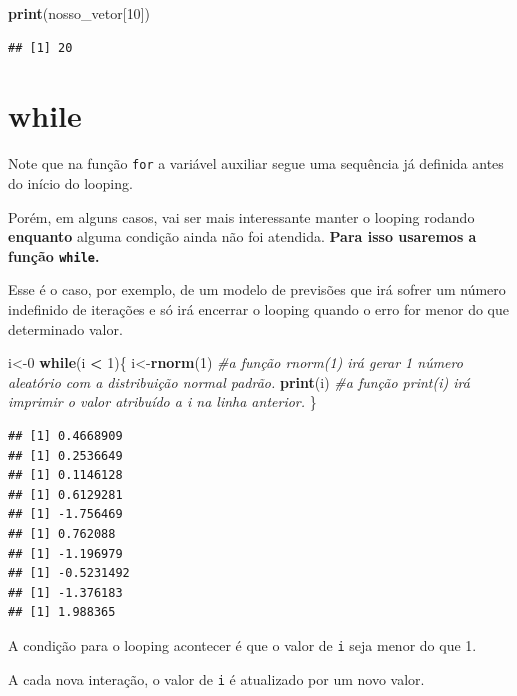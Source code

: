 \documentclass[
]{book}
\newenvironment{Shaded}{\begin{snugshade}}{\end{snugshade}}
\newcommand{\CommentTok}[1]{\textcolor[rgb]{0.56,0.35,0.01}{\textit{#1}}}
\newcommand{\ControlFlowTok}[1]{\textcolor[rgb]{0.13,0.29,0.53}{\textbf{#1}}}
\newcommand{\DecValTok}[1]{\textcolor[rgb]{0.00,0.00,0.81}{#1}}
\newcommand{\KeywordTok}[1]{\textcolor[rgb]{0.13,0.29,0.53}{\textbf{#1}}}
\newcommand{\NormalTok}[1]{#1}
\newcommand{\OperatorTok}[1]{\textcolor[rgb]{0.81,0.36,0.00}{\textbf{#1}}}
\newcommand{\StringTok}[1]{\textcolor[rgb]{0.31,0.60,0.02}{#1}}
\begin{document}
\begin{Shaded}
\begin{Highlighting}[]
\KeywordTok{print}\NormalTok{(nosso_vetor[}\DecValTok{10}\NormalTok{])}
\end{Highlighting}
\end{Shaded}

\begin{verbatim}
## [1] 20
\end{verbatim}

\hypertarget{while}{%
\section{while}\label{while}}

Note que na função \texttt{for} a variável auxiliar segue uma sequência
já definida antes do início do looping.

Porém, em alguns casos, vai ser mais interessante manter o looping
rodando \textbf{enquanto} alguma condição ainda não foi atendida.
\textbf{Para isso usaremos a função \texttt{while}.}

Esse é o caso, por exemplo, de um modelo de previsões que irá sofrer um
número indefinido de iterações e só irá encerrar o looping quando o erro
for menor do que determinado valor.

\begin{Shaded}
\begin{Highlighting}[]
\NormalTok{i<-}\DecValTok{0}
\ControlFlowTok{while}\NormalTok{(i }\OperatorTok{<}\StringTok{ }\DecValTok{1}\NormalTok{)\{}
\NormalTok{  i<-}\KeywordTok{rnorm}\NormalTok{(}\DecValTok{1}\NormalTok{) }\CommentTok{#a função rnorm(1) irá gerar 1 número aleatório com a distribuição normal padrão.}
  \KeywordTok{print}\NormalTok{(i)    }\CommentTok{#a função print(i) irá imprimir o valor atribuído a i na linha anterior.}
\NormalTok{\}}
\end{Highlighting}
\end{Shaded}

\begin{verbatim}
## [1] 0.4668909
## [1] 0.2536649
## [1] 0.1146128
## [1] 0.6129281
## [1] -1.756469
## [1] 0.762088
## [1] -1.196979
## [1] -0.5231492
## [1] -1.376183
## [1] 1.988365
\end{verbatim}

A condição para o looping acontecer é que o valor de \texttt{i} seja
menor do que 1.

A cada nova interação, o valor de \texttt{i} é atualizado por um novo
valor.
\end{document}
